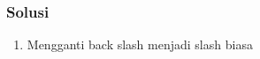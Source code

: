         \subsubsection{Solusi}
            \begin{enumerate}
                \item Mengganti back slash menjadi slash biasa
            \end{enumerate}